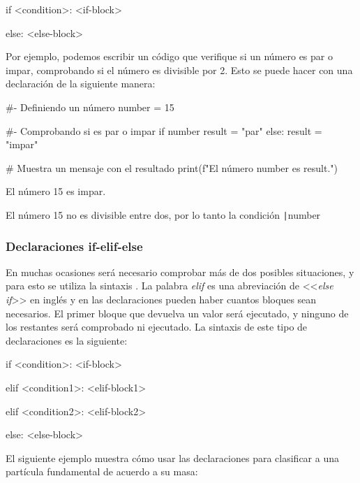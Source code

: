 \begin{shell}
if <condition>:
    <if-block>

else:
    <else-block>
\end{shell}

Por ejemplo, podemos escribir un código que verifique si un número es par o impar, comprobando si el número es divisible por 2. Esto se puede hacer con una declaración  de la siguiente manera:

\begin{pyin}[]
#- Definiendo un número
number = 15 

#- Comprobando si es par o impar
if number %
    result = "par"
else:
    result = "impar"
    
# Muestra un mensaje con el resultado
print(f"El número {number} es {result}.")    
\end{pyin}
\begin{pyprint}
El número 15 es impar.
\end{pyprint}

El número 15 no es divisible entre dos, por lo tanto la condición \texttt|number %

\subsubsection{Declaraciones if-elif-else}
En muchas ocasiones será necesario comprobar más de dos posibles situaciones, y para esto se utiliza la sintaxis . La palabra \emph{elif} es una abreviación de <<\emph{else if}>> en inglés y en las declaraciones pueden haber cuantos bloques  sean necesarios. El primer bloque que devuelva un valor  será ejecutado, y ninguno de los restantes será comprobado ni ejecutado. La sintaxis de este tipo de declaraciones es la siguiente:

\begin{shell}
if <condition>:
    <if-block>

elif <condition1>:
    <elif-block1>

elif <condition2>:
    <elif-block2>

else:
    <else-block>
\end{shell}

El siguiente ejemplo muestra cómo usar las declaraciones  para clasificar a una partícula fundamental de acuerdo a su masa:

